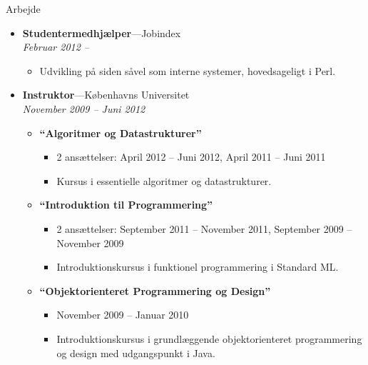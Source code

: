 \documentclass[11pt,oneside,a4paper]{article}
\newenvironment{ressection}[1]{
	\vspace{4pt}
	{\fontfamily{phv}\selectfont\Large#1}
	\begin{itemize}
	\vspace{3pt}
}{
	\end{itemize}
}
\newcommand{\resitem}[1]{
	\vspace{-4pt}
	\item \begin{flushleft} #1 \end{flushleft}
}
\newcommand{\ressubitem}[1]{
	\vspace{-1pt}
	\item \begin{flushleft} #1 \end{flushleft}
}
\newcommand{\resbigitem}[3]{
	\vspace{-5pt}
	\item
	\textbf{#1}---#2 \\
	\textit{#3}
}
\newenvironment{ressubsec}[3]{
	\resbigitem{#1}{#2}{#3}
	\vspace{-2pt}
	\begin{itemize}
}{
	\end{itemize}
}
\newenvironment{reslist}[1]{
	\resitem{\textbf{#1}}
	\vspace{-2pt}
	\begin{itemize}
}{
	\end{itemize}
}
\begin{document}
\begin{ressection}{Arbejde}
	\begin{ressubsec}{Studentermedhjælper}{Jobindex}{Februar 2012 -- }
		\ressubitem{Udvikling på siden såvel som interne systemer, hovedsageligt i Perl.}
	\end{ressubsec}

    \begin{ressubsec}{Instruktor}{Københavns Universitet}{November 2009 -- Juni 2012}
        \begin{reslist}{``Algoritmer og Datastrukturer''}
            \ressubitem{2 ansættelser: April 2012 -- Juni 2012, April 2011 -- Juni 2011}
            \ressubitem{Kursus i essentielle algoritmer og datastrukturer.}
        \end{reslist}
        \begin{reslist}{``Introduktion til Programmering''}
            \ressubitem{2 ansættelser: September 2011 -- November 2011, September 2009 -- November 2009}
            \ressubitem{Introduktionskursus i funktionel programmering i Standard ML.}
        \end{reslist}
        \begin{reslist}{``Objektorienteret Programmering og Design''}
            \ressubitem{November 2009 -- Januar 2010}
            \ressubitem{Introduktionskursus i grundlæggende objektorienteret programmering og design med udgangspunkt i Java.}
        \end{reslist}
    \end{ressubsec}


\end{ressection}
\end{document}
